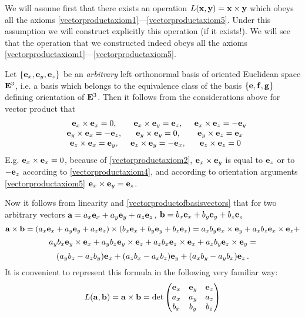 \documentclass[12pt]{article}
\numberwithin{equation}{section}
\begin{document}
\m





 We will   assume  first that there exists an  operation $L({\bf x},{\bf y})={\bf x}\times {\bf y}$
 which obeys all the axioms \eqref{vectorproductaxiom1}---\eqref{vectorproductaxiom5}.
 Under this assumption we will construct explicitly this operation (if it exists!). We will see that
 the operation that we constructed indeed obeys
 all the axioms \eqref{vectorproductaxiom1}---\eqref{vectorproductaxiom5}.


Let $\{{\bf e}_x,{\bf e}_y,{\bf e}_z\}$ be an {\it arbitrary } left
orthonormal basis of oriented Euclidean space ${\bf E}^3$, i.e. a basis
which belongs to the equivalence class of the basis $\{{\bf e},{\bf f},{\bf g}\}$
  defining orientation of ${\bf E}^3$.
Then it follows from the considerations above for vector product that
   \begin{equation}\label{vectorproductofbasisvectors}
   \begin{matrix}
    &{\bf e}_x\times {\bf e}_x=0,\,&{\bf e}_x\times {\bf e}_y={\bf e}_z,\,&{\bf e}_x\times {\bf e}_z=-{\bf e}_y \\
&{\bf e}_y\times {\bf e}_x=-{\bf e}_z,\,&{\bf e}_y\times {\bf e}_y=0,\,&{\bf e}_y\times {\bf e}_z={\bf e}_x \\
&{\bf e}_z\times {\bf e}_x={\bf e}_y,\,&{\bf e}_z\times {\bf e}_y=-{\bf e}_x,\,&{\bf e}_z\times {\bf e}_z=0
          \end{matrix}
   \end{equation}
  E.g. ${\bf e}_x\times {\bf e}_x=0$, because of \eqref{vectorproductaxiom2},
    ${\bf e}_x\times {\bf e}_y$ is equal to ${\bf e}_z$ or to $-{\bf e}_z$ according to
    \eqref{vectorproductaxiom4}, and according to orientation arguments \eqref{vectorproductaxiom5}
      ${\bf e}_x\times {\bf e}_y={\bf e}_z$.

      \m


 Now it follows from linearity and \eqref{vectorproductofbasisvectors} that
 for two arbitrary vectors
 ${\bf a}=a_x{\bf e}_x+a_y{\bf e}_y+a_z{\bf e}_z$, ${\bf b}=b_x{\bf e}_x+b_y{\bf e}_y+b_z{\bf e}_z$
              $$
   {\bf a}\times {\bf b}=(a_x{\bf e}_x+a_y{\bf e}_y+a_z{\bf e}_z)\times (b_x{\bf e}_x+b_y{\bf e}_y+b_z{\bf e}_z)=
   a_xb_y{\bf e}_x\times{\bf e}_y+a_xb_z{\bf e}_x\times {\bf e}_z+
                 $$
                 $$
   a_yb_x{\bf e}_y\times{\bf e}_x+a_yb_z{\bf e}_y\times{\bf e}_z+a_zb_x{\bf e}_z\times {\bf e}_x+a_zb_y{\bf e}_z\times{\bf e}_y=
              $$
            \begin{equation}\label{defofvectorproduct}
            (a_yb_z-a_zb_y){\bf e}_x+(a_zb_x-a_xb_z){\bf e}_y+(a_xb_y-a_yb_x){\bf e}_z\,.
            \end{equation}
        It is convenient to represent this formula in the following very familiar way:
         \begin{equation}\label{defofvectorproduct}
           L({\bf a},{\bf b})={\bf a}\times {\bf b}=
                \det
                \begin{pmatrix}
                {\bf e}_x  &{\bf e}_y  &{\bf e}_z \\
                  a_x   & a_y  &a_z \\
                  b_x   & b_y  &b_z
                  \end{pmatrix}
            \end{equation}
\m
\end{document}
